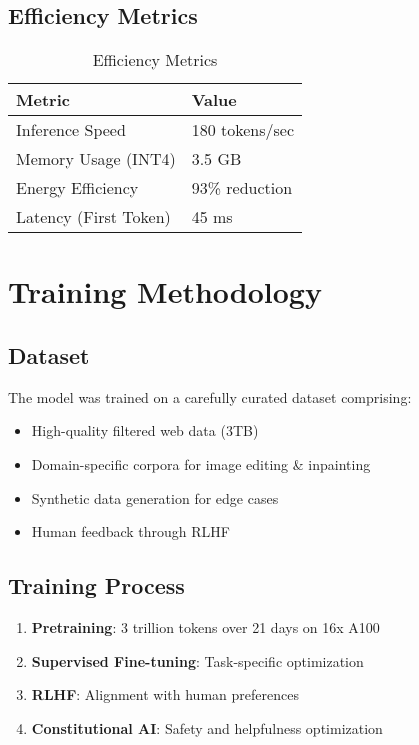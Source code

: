 \documentclass[11pt,a4paper]{article}
\begin{document}
\subsection{Efficiency Metrics}

\begin{table}[H]
\centering
\begin{tabular}{ll}
\toprule
\textbf{Metric} & \textbf{Value} \\
\midrule
Inference Speed & 180 tokens/sec \\
Memory Usage (INT4) & 3.5 GB \\
Energy Efficiency & 93\% reduction \\
Latency (First Token) & 45 ms \\
\bottomrule
\end{tabular}
\caption{Efficiency Metrics}
\end{table}

\section{Training Methodology}

\subsection{Dataset}
The model was trained on a carefully curated dataset comprising:
\begin{itemize}
    \item High-quality filtered web data (3TB)
    \item Domain-specific corpora for image editing & inpainting
    \item Synthetic data generation for edge cases
    \item Human feedback through RLHF
\end{itemize}

\subsection{Training Process}
\begin{enumerate}
    \item \textbf{Pretraining}: 3 trillion tokens over 21 days on 16x A100
    \item \textbf{Supervised Fine-tuning}: Task-specific optimization
    \item \textbf{RLHF}: Alignment with human preferences
    \item \textbf{Constitutional AI}: Safety and helpfulness optimization
\end{enumerate}
\end{document}
